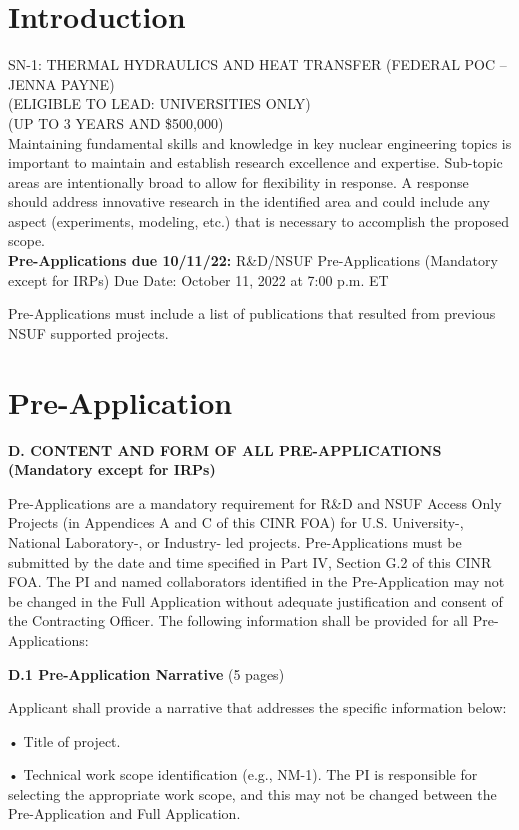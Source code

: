\section{Introduction}

SN-1: THERMAL HYDRAULICS AND HEAT TRANSFER (FEDERAL POC – JENNA PAYNE) \\
(ELIGIBLE TO LEAD: UNIVERSITIES ONLY) \\
(UP TO 3 YEARS AND \$500,000) \\

Maintaining fundamental skills and knowledge in key nuclear engineering topics
is important to maintain and establish research excellence and expertise.
Sub-topic areas are intentionally broad to allow for flexibility in response. A
response should address innovative research in the identified area and could
include any aspect (experiments, modeling, etc.) that is necessary to
accomplish the proposed scope.
\\

{\bf Pre-Applications due 10/11/22:}
R\&D/NSUF Pre-Applications (Mandatory except for IRPs) Due Date: October 11, 2022 at 7:00 p.m. ET


Pre-Applications must include a list of publications
that resulted from previous NSUF supported projects.


\section{Pre-Application}


{\bf D. CONTENT AND FORM OF ALL PRE-APPLICATIONS (Mandatory except for IRPs)}

Pre-Applications are a mandatory requirement for R\&D and NSUF Access Only
Projects (in Appendices A and C of this CINR FOA) for U.S. University-,
National Laboratory-, or Industry- led projects. Pre-Applications must be
submitted by the date and time specified in Part IV, Section G.2 of this CINR
FOA.  The PI and named collaborators identified in the Pre-Application may not
be changed in the Full Application without adequate justification and consent
of the Contracting Officer.  The following information shall be provided for
all Pre-Applications:

{\bf D.1 Pre-Application Narrative} (5 pages)

Applicant shall provide a narrative that addresses the specific information below:

• Title of project.

• Technical work scope identification (e.g., NM-1). The PI is responsible for
selecting the appropriate work scope, and this may not be changed between the
Pre-Application and Full Application.

